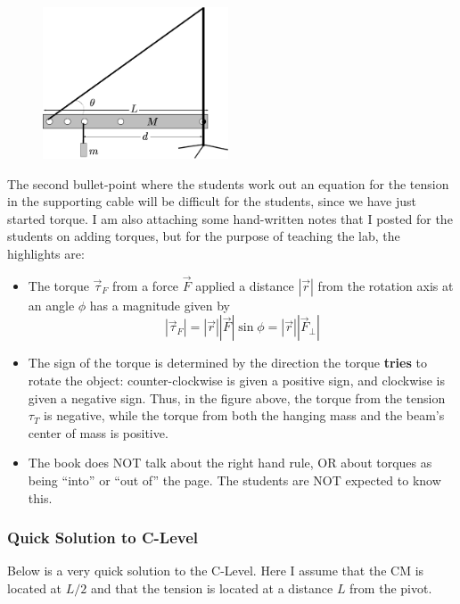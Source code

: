 \documentclass[fleqn,letterpaper]{article}
\begin{document}
\begin{figure}[h!]
\centering
 \includegraphics[height=45mm]{Figure1.eps}
\end{figure}


The second bullet-point where the students work out an equation for the tension in the supporting cable will be difficult for the students, since we have just started torque.  I am also attaching some hand-written notes that I posted for the students on adding torques, but for the purpose of teaching the lab, the highlights are:

\begin{itemize}
 \item{The torque $\vec{\tau}_F$ from a force $\vec{F}$ applied a distance $|\vec{r}|$ from the rotation axis at an angle $\phi$ has a magnitude given by
 \begin{equation}
  |\vec{\tau}_F| = |\vec{r}| |\vec{F}| \sin{\phi} = |\vec{r}| |\vec{F}_{\perp}|
 \end{equation}}
 \item{The sign of the torque is determined by the direction the torque \textbf{tries} to rotate the object: counter-clockwise is given a positive sign, and clockwise is given a negative sign.  Thus, in the figure above, the torque from the tension $\tau_T$ is negative, while the torque from both the hanging mass and the beam's center of mass is positive.}
 \item{The book does NOT talk about the right hand rule, OR about torques as being ``into'' or ``out of'' the page.  The students are NOT expected to know this.}
\end{itemize}

\subsubsection*{Quick Solution to C-Level}

Below is a very quick solution to the C-Level.  Here I assume that the CM is located at $L/2$ and that the tension is located at a distance $L$ from the pivot.  
\end{document}
